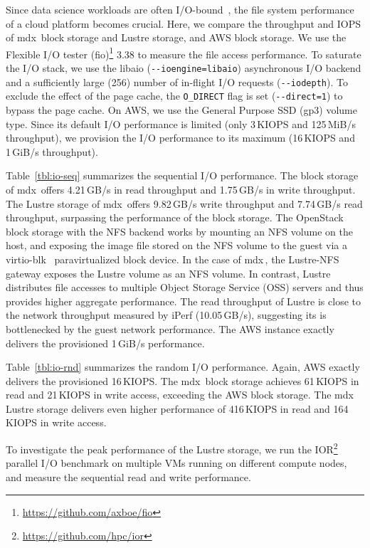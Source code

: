 \documentclass[a4paper,twoside]{article}
\newcommand{\mdx}{mdx\,\uppercase\expandafter{\romannumeral 2\relax}}
\begin{document}
Since data science workloads are often I/O-bound~\cite{PhilipChen2014}, the file system performance
of a cloud platform becomes crucial.
Here, we compare the throughput and IOPS of \mdx{} block storage and Lustre storage, and AWS
block storage. We use the Flexible I/O tester (fio)\footnote{\url{https://github.com/axboe/fio}} 3.38 to measure the file access
performance. To saturate the I/O stack, we use the libaio (\verb|--ioengine=libaio|) asynchronous
I/O backend and a sufficiently large (256) number of in-flight I/O requests (\verb|--iodepth|). To
exclude the effect of the page cache, the \verb|O_DIRECT| flag is set (\verb|--direct=1|) to bypass
the page cache. On AWS, we use the General Purpose SSD (gp3) volume type. Since its default I/O
performance is limited (only 3\,KIOPS and 125\,MiB/s throughput), we provision the I/O performance to
its maximum (16\,KIOPS and 1\,GiB/s throughput).

Table~\ref{tbl:io-seq} summarizes the sequential I/O performance. The block storage of \mdx{} offers
4.21\,GB/s in read throughput and 1.75\,GB/s in write throughput. The Lustre storage of \mdx{}
offers 9.82\,GB/s write throughput and 7.74\,GB/s read throughput, surpassing the performance of the
block storage. The OpenStack block storage with the NFS backend works by mounting an NFS volume on the
host, and exposing the image file stored on the NFS volume to the guest via a
virtio-blk~\cite{Russell2008,Bugnion2017} paravirtualized block device. In the case of \mdx{}, the
Lustre-NFS gateway exposes the Lustre volume as an NFS volume. In contrast, Lustre distributes file
accesses to multiple Object Storage Service (OSS) servers and thus provides higher aggregate
performance. The read throughput of Lustre is close to the network throughput measured by iPerf (10.05\,GB/s),
suggesting its is bottlenecked by the guest network performance. The AWS instance exactly delivers
the provisioned 1\,GiB/s performance.

Table~\ref{tbl:io-rnd} summarizes the random I/O performance. Again, AWS exactly delivers the provisioned
16\,KIOPS. The \mdx{} block storage achieves 61\,KIOPS in read and 21\,KIOPS in write access,
exceeding the AWS block storage. The \mdx{} Lustre storage delivers even higher performance of
416\,KIOPS in read and 164\,KIOPS in write access.

To investigate the peak performance of the Lustre storage, we run the
IOR\footnote{\url{https://github.com/hpc/ior}} parallel I/O benchmark on multiple VMs running on different compute nodes,
and measure the sequential read and write performance. 
\end{document}
